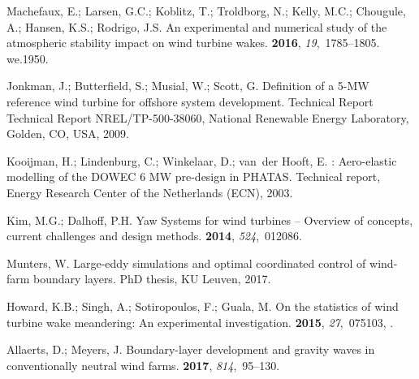\documentclass[energies,article,submit,moreauthors,latex,10pt,a4paper]{mdpi}
\begin{document}
\begin{thebibliography}{999}
	Machefaux, E.; Larsen, G.C.; Koblitz, T.; Troldborg, N.; Kelly, M.C.; Chougule,
	A.; Hansen, K.S.; Rodrigo, J.S.
	\newblock An experimental and numerical study of the atmospheric stability
	impact on wind turbine wakes.
	 {\bf 2016}, {\em 19},~1785--1805.
	\newblock we.1950.
	
	Jonkman, J.; Butterfield, S.; Musial, W.; Scott, G.
	\newblock Definition of a 5-{MW} reference wind turbine for offshore system
	development.
	\newblock Technical Report Technical Report NREL/TP-500-38060, National
	Renewable Energy Laboratory, Golden, CO, USA,  2009.
	
	Kooijman, H.; Lindenburg, C.; Winkelaar, D.; van~der Hooft, E.
	: {A}ero-elastic modelling of the {DOWEC} 6
	{MW} pre-design in {PHATAS}.
	\newblock Technical report, Energy Research Center of the Netherlands (ECN),
	2003.
	
	Kim, M.G.; Dalhoff, P.H.
	\newblock Yaw Systems for wind turbines -- Overview of concepts, current
	challenges and design methods.
	 {\bf 2014}, {\em
		524},~012086.
	
	Munters, W.
	\newblock Large-eddy simulations and optimal coordinated control of wind-farm
	boundary layers.
	\newblock PhD thesis, KU Leuven,  2017.
	
	Howard, K.B.; Singh, A.; Sotiropoulos, F.; Guala, M.
	\newblock On the statistics of wind turbine wake meandering: An experimental
	investigation.
	 {\bf 2015}, {\em 27},~075103,
	\href{http://xxx.lanl.gov/abs/http://dx.doi.org/10.1063/1.4923334}{{}}.
	
	Allaerts, D.; Meyers, J.
	\newblock Boundary-layer development and gravity waves in conventionally
	neutral wind farms.
	 {\bf 2017}, {\em 814},~95--130.
	

\end{thebibliography}
\end{document}
